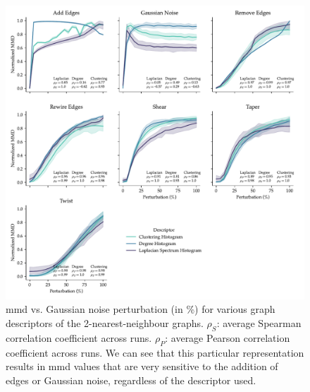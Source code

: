 \begin{figure}
  \centering
  \includegraphics[width=\textwidth]{./figures/results/res_1_3.pdf}
  \caption[2-nearest-neighbour graphs result in descriptors highly sensitive to
the addition of edges and Gaussian noise.]{\acrshort{mmd} vs. Gaussian noise perturbation
(in \%) for various graph descriptors of the 2-nearest-neighbour graphs.
$\rho_{S}$: average Spearman correlation coefficient across runs. $\rho_{P}$:
average Pearson correlation coefficient across runs. We can see that this
particular representation results in \acrshort{mmd} values that are very sensitive to the
addition of edges or Gaussian noise, regardless of the descriptor used.}
  \label{fig:mmd_k_nn_graphs}
\end{figure}

